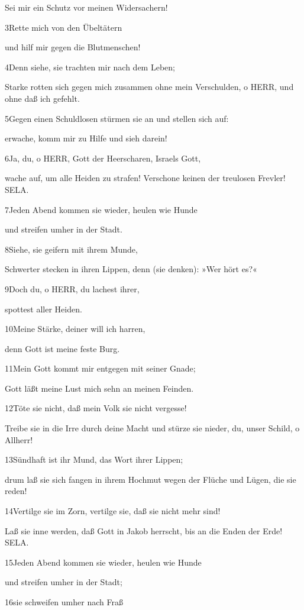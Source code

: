 Sei mir ein Schutz vor meinen Widersachern!

3Rette mich von den Übeltätern

und hilf mir gegen die Blutmenschen!

4Denn siehe, sie trachten mir nach dem Leben;

Starke rotten sich gegen mich zusammen ohne mein Verschulden, o HERR,
und ohne daß ich gefehlt.

5Gegen einen Schuldlosen stürmen sie an und stellen sich auf:

erwache, komm mir zu Hilfe und sieh darein!

6Ja, du, o HERR, Gott der Heerscharen, Israels Gott,

wache auf, um alle Heiden zu strafen! Verschone keinen der treulosen
Frevler! SELA.

7Jeden Abend kommen sie wieder, heulen wie Hunde

und streifen umher in der Stadt.

8Siehe, sie geifern mit ihrem Munde,

Schwerter stecken in ihren Lippen, denn (sie denken): »Wer hört es?«

9Doch du, o HERR, du lachest ihrer,

spottest aller Heiden.

10Meine Stärke, deiner will ich harren,

denn Gott ist meine feste Burg.

11Mein Gott kommt mir entgegen mit seiner Gnade;

Gott läßt meine Lust mich sehn an meinen Feinden.

12Töte sie nicht, daß mein Volk sie nicht vergesse!

Treibe sie in die Irre durch deine Macht und stürze sie nieder, du,
unser Schild, o Allherr!

13Sündhaft ist ihr Mund, das Wort ihrer Lippen;

drum laß sie sich fangen in ihrem Hochmut wegen der Flüche und Lügen,
die sie reden!

14Vertilge sie im Zorn, vertilge sie, daß sie nicht mehr sind!

Laß sie inne werden, daß Gott in Jakob herrscht, bis an die Enden der
Erde! SELA.

15Jeden Abend kommen sie wieder, heulen wie Hunde

und streifen umher in der Stadt;

16sie schweifen umher nach Fraß

